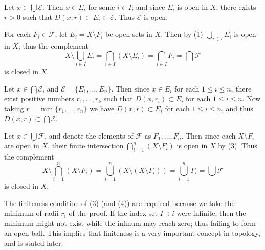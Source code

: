 \begin{myproof}
    \begin{nlist}
        \item Let \(x\in\bigcup\mathcal E\).
        Then \(x\in E_i\) for some \(i\in I\);
        and since \(E_i\) is open in \(X\),
        there exists \(r>0\) such that
        \(D(x,r)\subset E_i\subset\mathcal E\).
        Thus \(\mathcal E\) is open.

        \item For each \(F_i\in\mathcal F\),
        let \(E_i=X\setminus F_i\) be open sets in \(X\).
        Then by (1) \(\bigcup_{i\in I}E_i\) is open in \(X\);
        thus the complement
        \[
            X\setminus\bigcup_{i\in I}E_i
            =\bigcap_{i\in I}(X\setminus E_i)
            =\bigcap_{i\in I}F_i
            =\bigcap\mathcal F
        \]
        is closed in \(X\).

        \item Let \(x\in\bigcap\mathcal E\),
        and \(\mathcal E=\{E_1,\dots,E_n\}\).
        Then since \(x\in E_i\) for each \(1\le i\le n\),
        there exist positive numbers \(r_1,\dots,r_k\) such that
        \(D(x,r_i)\subset E_i\) for each \(1\le i\le n\).
        Now taking \(r=\min\{r_1,\dots,r_n\}\) we have
        \(D(x,r)\subset E_i\) for each \(1\le i\le n\),
        and thus \(D(x,r)\subset\bigcap\mathcal E\).

        \item Let \(x\in\bigcup\mathcal F\),
        and denote the elements of \(\mathcal F\) as
        \(F_1,\dots,F_n\).
        Then since each \(X\setminus F_i\) are open in \(X\),
        their finite intersection \(\bigcap_{i=1}^n(X\setminus F_i)\)
        is open in \(X\) by (3).
        Thus the complement
        \[
            X\setminus\bigcap_{i=1}^n(X\setminus F_i)
            =\bigcup_{i=1}^n(X\setminus(X\setminus F_i))
            =\bigcup_{i=1}^nF_i
            =\bigcup\mathcal F
        \]
        is closed in \(X\).
        \rightqed
    \end{nlist}
\end{myproof}

The finiteness condition of (3) (and (4)) are required
because we take the minimum of radii \(r_i\) of the proof.
If the index set \(I\ni i\) were infinite,
then the minimum might not exist while the infinum may reach zero;
thus failing to form an open ball.
This implies that finiteness is a very important concept in topology,
and is stated later.


